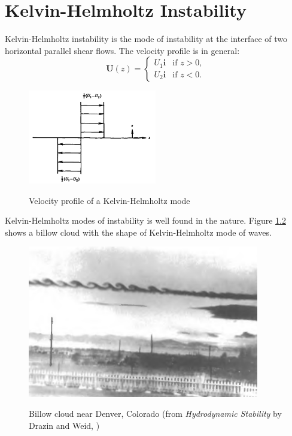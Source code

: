 \chapter{Kelvin-Helmholtz Instability}
Kelvin-Helmholtz instability is the mode of instability at the
interface of two horizontal parallel shear flows. The velocity
profile is in general:
\begin{equation}\label{kh:pro}
\mathbf{U}(z) =
\begin{cases} U_1 \mathbf{i} &\text{if $z>0$,}
\\
U_2 \mathbf{i} &\text{if $z<0$.}
\end{cases}
\end{equation}
\begin{figure}[htpb]
  \centering
  \includegraphics[width=0.5\textwidth]{khpro.png}\\
  \caption{Velocity profile of a Kelvin-Helmholtz mode}\label{khpro}
\end{figure}

Kelvin-Helmholtz modes of instability is well found in the nature.
Figure \ref{khphoto} shows a billow cloud with the shape of
Kelvin-Helmholtz mode of waves.
\begin{figure}[htpb]
  \centering
  \includegraphics[width=0.9\textwidth]{khphoto.png}\\
  \caption{Billow cloud near Denver, Colorado (from \emph{Hydrodynamic Stability} by Drazin and Weid, \cite{Drazin})}\label{khphoto}
\end{figure}

